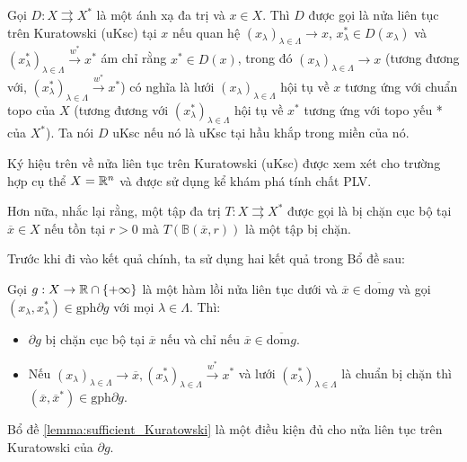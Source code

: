 \begin{defi}
    Gọi $D: X \rightrightarrows X^*$ là một ánh xạ đa trị và $x \in X$. Thì $D$ được gọi là nửa liên tục trên Kuratowski (uKsc) tại $x$ nếu quan hệ $(x_\lambda)_{\lambda \in \varLambda} \rightarrow x$, $x^*_\lambda \in D(x_\lambda)$ và $(x^*_\lambda)_{\lambda \in \varLambda} \overset{w^*}{\rightarrow} x^*$ ám chỉ rằng $x^* \in D(x)$, trong đó $(x_\lambda)_{\lambda \in \varLambda} \rightarrow x$ (tương đương với, $(x^*_\lambda)_{\lambda \in \varLambda} \overset{w^*}{\rightarrow} x^*$) có nghĩa là lưới $(x_{\lambda})_{\lambda \in \varLambda}$ hội tụ về $x$ tương ứng với chuẩn topo của $X$ (tương đương với $(x^*_\lambda)_{\lambda \in \varLambda}$ hội tụ về $x^*$ tương ứng với topo yếu * của $X^*$). Ta nói $D$ uKsc nếu nó là uKsc tại hầu khắp trong miền của nó.
\end{defi}

Ký hiệu trên về nửa liên tục trên Kuratowski (uKsc) được xem xét cho trường hợp cụ thể $X = \mathbb{R}^n$ và được sử dụng kể khám phá tính chất PLV.

Hơn nữa, nhắc lại rằng, một tập đa trị $T: X \rightrightarrows X^*$ được gọi là bị chặn cục bộ tại $\overline{x} \in X$ nếu tồn tại $r > 0$ mà $T(\mathbb{B}(\overline{x}, r))$ là một tập bị chặn. 

Trước khi đi vào kết quả chính, ta sử dụng hai kết quả trong Bổ đề sau:

\begin{lemma}
    \label{lemma:sufficient_Kuratowski}
    Gọi $g: X \rightarrow \mathbb{R} \cap \{+\infty\}$ là một hàm lồi nửa liên tục dưới và $\overline{x} \in \overline{\text{dom}g}$ và gọi $(x_\lambda, x_\lambda^*) \in \text{gph}\partial g$ với mọi $\lambda \in \varLambda$. Thì:
    \begin{itemize}
        \item $\partial g$ bị chặn cục bộ tại $\overline{x}$ nếu và chỉ nếu $\overline{x} \in \overline{\text{dom}g}$.
        \item Nếu $(x_\lambda)_{\lambda \in \varLambda} \rightarrow \overline{x}, (x_\lambda^*)_{\lambda \in \varLambda} \overset{w^*}{\rightarrow} x^*$ và lưới $(x_\lambda^*)_{\lambda \in \varLambda}$ là chuẩn bị chặn thì $(\overline{x}, \overline{x}^*) \in \text{gph}\partial g$.
    \end{itemize}
\end{lemma}

Bổ đề \ref{lemma:sufficient_Kuratowski} là một điều kiện đủ cho nửa liên tục trên Kuratowski của $\partial g$.

